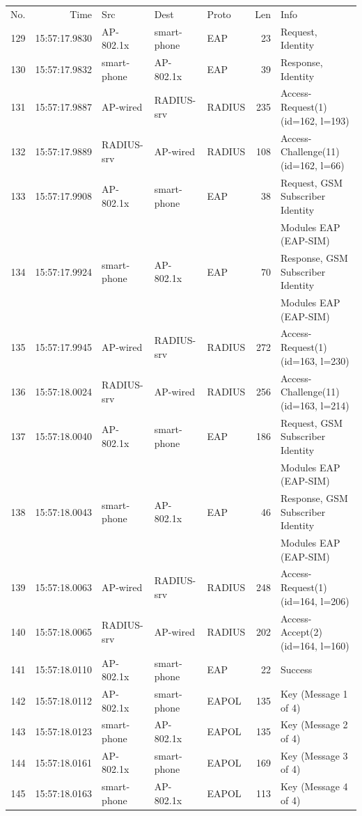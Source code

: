 \documentclass[12pt,a4paper,english]{tutthesis}
\begin{document}
\begin{otherlanguage}{english}
\scriptsize
\begin{center}
\begin{tabular}{rrlllrl}
No. & Time & Src & Dest & Proto & Len & Info\\
129 & 15:57:17.9830 & AP-802.1x & smartphone & EAP & 23 & Request, Identity\\
130 & 15:57:17.9832 & smartphone & AP-802.1x & EAP & 39 & Response, Identity\\
131 & 15:57:17.9887 & AP-wired & RADIUS-srv & RADIUS & 235 & Access-Request(1) (id=162, l=193)\\
132 & 15:57:17.9889 & RADIUS-srv & AP-wired & RADIUS & 108 & Access-Challenge(11) (id=162, l=66)\\
133 & 15:57:17.9908 & AP-802.1x & smartphone & EAP & 38 & Request, GSM Subscriber Identity\\
 &  &  &  &  &  & Modules EAP (EAP-SIM)\\
134 & 15:57:17.9924 & smartphone & AP-802.1x & EAP & 70 & Response, GSM Subscriber Identity\\
 &  &  &  &  &  & Modules EAP (EAP-SIM)\\
135 & 15:57:17.9945 & AP-wired & RADIUS-srv & RADIUS & 272 & Access-Request(1) (id=163, l=230)\\
136 & 15:57:18.0024 & RADIUS-srv & AP-wired & RADIUS & 256 & Access-Challenge(11) (id=163, l=214)\\
137 & 15:57:18.0040 & AP-802.1x & smartphone & EAP & 186 & Request, GSM Subscriber Identity\\
 &  &  &  &  &  & Modules EAP (EAP-SIM)\\
138 & 15:57:18.0043 & smartphone & AP-802.1x & EAP & 46 & Response, GSM Subscriber Identity\\
 &  &  &  &  &  & Modules EAP (EAP-SIM)\\
139 & 15:57:18.0063 & AP-wired & RADIUS-srv & RADIUS & 248 & Access-Request(1) (id=164, l=206)\\
140 & 15:57:18.0065 & RADIUS-srv & AP-wired & RADIUS & 202 & Access-Accept(2) (id=164, l=160)\\
141 & 15:57:18.0110 & AP-802.1x & smartphone & EAP & 22 & Success\\
142 & 15:57:18.0112 & AP-802.1x & smartphone & EAPOL & 135 & Key (Message 1 of 4)\\
143 & 15:57:18.0123 & smartphone & AP-802.1x & EAPOL & 135 & Key (Message 2 of 4)\\
144 & 15:57:18.0161 & AP-802.1x & smartphone & EAPOL & 169 & Key (Message 3 of 4)\\
145 & 15:57:18.0163 & smartphone & AP-802.1x & EAPOL & 113 & Key (Message 4 of 4)\\
\end{tabular}
\end{center}
\normalsize





\end{otherlanguage}
\end{document}
